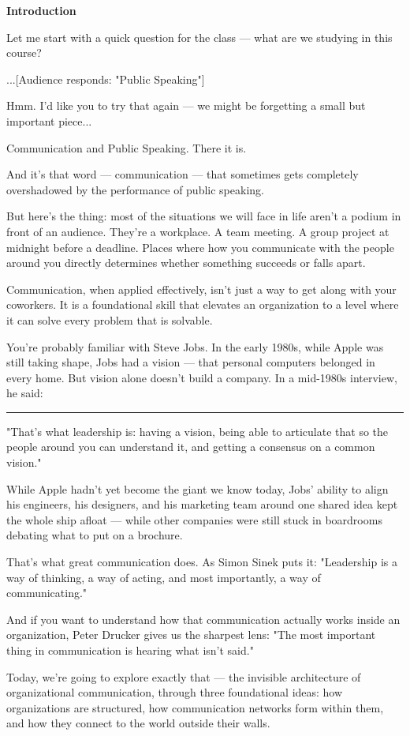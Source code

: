 \documentclass[12pt]{article}
\begin{document}
\begin{center}
  {\Large \textbf{Introduction}}\\[0.3em]
\end{center}

Let me start with a quick question for the class — what are we studying in this course?

...[Audience responds: "Public Speaking"]

Hmm. I'd like you to try that again — we might be forgetting a small but important piece...

Communication and Public Speaking. There it is.

And it's that word — communication — that sometimes gets completely overshadowed by the performance of public speaking.

But here's the thing: most of the situations we will face in life aren't a podium in front of an audience. They're a workplace. A team meeting. A group project at midnight before a deadline. Places where how you communicate with the people around you directly determines whether something succeeds or falls apart.

Communication, when applied effectively, isn't just a way to get along with your coworkers. It is a foundational skill that elevates an organization to a level where it can solve every problem that is solvable.

You're probably familiar with Steve Jobs. In the early 1980s, while Apple was still taking shape, Jobs had a vision — that personal computers belonged in every home. But vision alone doesn't build a company. In a mid-1980s interview, he said:

\vspace{1em}
\noindent\rule{\textwidth}{0.4pt}
\vspace{1em}

"That's what leadership is: having a vision, being able to articulate that so the people around you can understand it, and getting a consensus on a common vision."

While Apple hadn't yet become the giant we know today, Jobs' ability to align his engineers, his designers, and his marketing team around one shared idea kept the whole ship afloat — while other companies were still stuck in boardrooms debating what to put on a brochure.

That's what great communication does. As Simon Sinek puts it: "Leadership is a way of thinking, a way of acting, and most importantly, a way of communicating."

And if you want to understand how that communication actually works inside an organization, Peter Drucker gives us the sharpest lens: "The most important thing in communication is hearing what isn't said."

Today, we're going to explore exactly that — the invisible architecture of organizational communication, through three foundational ideas: how organizations are structured, how communication networks form within them, and how they connect to the world outside their walls.
\end{document}
